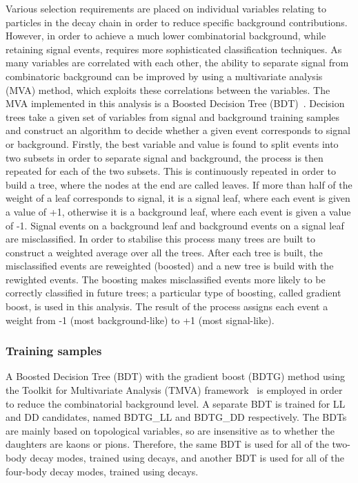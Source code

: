 Various selection requirements are placed on individual variables relating to particles in the decay chain in order to reduce specific background contributions. However, in order to achieve a much lower combinatorial background, while retaining signal events, requires more sophisticated classification techniques. As many variables are correlated with each other, the ability to separate signal from combinatoric background can be improved by using a multivariate analysis (MVA) method, which exploits these correlations between the variables. The MVA implemented in this analysis is a Boosted Decision Tree (BDT)~\cite{Breiman}. Decision trees take a given set of variables from signal and background training samples and construct an algorithm to decide whether a given event corresponds to signal or background. Firstly, the best variable and value is found to split events into two subsets in order to separate signal and background, the process is then repeated for each of the two subsets. This is continuously repeated in order to build a tree, where the nodes at the end are called leaves. If more than half of the weight of a leaf corresponds to signal, it is a signal leaf, where each event is given a value of +1, otherwise it is a background leaf, where each event is given a value of -1. Signal events on a background leaf and background events on a signal leaf are misclassified. In order to stabilise this process many trees are built to construct a weighted average over all the trees. After each tree is built, the misclassified events are reweighted (boosted) and a new tree is build with the rewighted events. The boosting makes misclassified events more likely to be correctly classified in future trees; a particular type of boosting, called gradient boost, is used in this analysis. The result of the process assigns each event a weight from -1 (most background-like) to +1 (most signal-like). 

\subsubsection{Training samples}

A Boosted Decision Tree (BDT) with the gradient boost (BDTG) method using the Toolkit for Multivariate Analysis (TMVA) framework~\cite{TMVA} is employed in order to reduce the combinatorial background level. A separate BDT is trained for LL and DD candidates, named BDTG\_LL and BDTG\_DD respectively. The BDTs are mainly based on topological variables, so are insensitive as to whether the \Dz daughters are kaons or pions. Therefore, the same BDT is used for all of the two-body \Dz decay modes, trained using \kpi decays, and another BDT is used for all of the four-body \Dz decay modes, trained using \kpipipi decays. 

